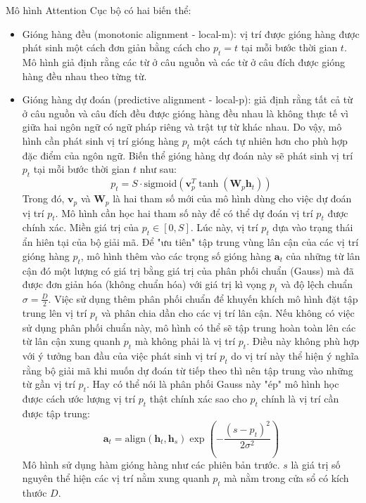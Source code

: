 Mô hình Attention Cục bộ có hai biến thể:
\begin{itemize}
	\item Gióng hàng đều (monotonic alignment - local-m): vị trí được gióng hàng được phát sinh một cách đơn giản bằng cách cho $p_t = t$ tại mỗi bước thời gian $t$. Mô hình giả định rằng các từ ở câu nguồn và các từ ở câu đích được gióng hàng đều nhau theo từng từ.
	\item Gióng hàng dự đoán (predictive alignment - local-p): giả định rằng tất cả từ ở câu nguồn và câu đích đều được gióng hàng đều nhau là không thực tế vì giữa hai ngôn ngữ có ngữ pháp riêng và trật tự từ khác nhau. Do vậy, mô hình cần phát sinh vị trí gióng hàng $p_t$ một cách tự nhiên hơn cho phù hợp đặc điểm của ngôn ngữ. Biến thể gióng hàng dự đoán này sẽ phát sinh vị trí $p_t$ tại mỗi bước thời gian $t$ như sau:
	\begin{equation}
	p_t = S \cdot \text{sigmoid} (\bm{v}^T_p \tanh(\bm{W}_p \bm{h}_t))
	\end{equation}
	Trong đó, $\bm{v}_p$ và $\bm{W}_p$ là hai tham số mới của mô hình dùng cho việc dự đoán vị trí $p_t$. Mô hình cần học hai tham số này để có thể dự đoán vị trí $p_t$ được chính xác. Miền giá trị của $p_t \in [0, S]$. Lúc này, vị trí $p_t$ dựa vào trạng thái ẩn hiên tại của bộ giải mã.
	Để "ưu tiên" tập trung vùng lân cận của các vị trí gióng hàng $p_t$, mô hình thêm vào các trọng số gióng hàng $\bm{a}_t$ của những từ lân cận đó một lượng có giá trị bằng giá trị của phân phối chuẩn (Gauss) mà đã được đơn giản hóa (không chuẩn hóa) với giá trị kì vọng $p_t$ và độ lệch chuẩn $\sigma = \frac{D}{2}$. Việc sử dụng thêm phân phối chuẩn để khuyến khích mô hình đặt tập trung lên vị trí $p_t$ và phân chia dần cho các vị trí lân cận. Nếu không có việc sử dụng phân phối chuẩn này, mô hình có thể sẽ tập trung hoàn toàn lên các từ lân cận xung quanh $p_t$ mà không phải là vị trí $p_t$. Điều này không phù hợp với ý tưởng ban đầu của việc phát sinh vị trí $p_t$ do vị trí này thể hiện ý nghĩa rằng bộ giải mã khi muốn dự đoán từ tiếp theo thì nên tập trung vào những từ gần vị trí $p_t$. Hay có thể nói là phân phối Gauss này "ép" mô hình học được cách ước lượng vị trí $p_t$ thật chính xác sao cho $p_t$ chính là vị trí cần được tập trung:
	\begin{equation}
	\bm{a}_t = \text{align}(\bm{h}_t, \bm{h}_s)\exp\left(-\frac{(s-p_t)^2}{2\sigma^2}\right)
	\end{equation}
	Mô hình sử dụng hàm gióng hàng như các phiên bản trước. $s$ là giá trị số nguyên thể hiện các vị trí nằm xung quanh $p_t$ mà nằm trong cửa sổ có kích thước $D$.
\end{itemize}

